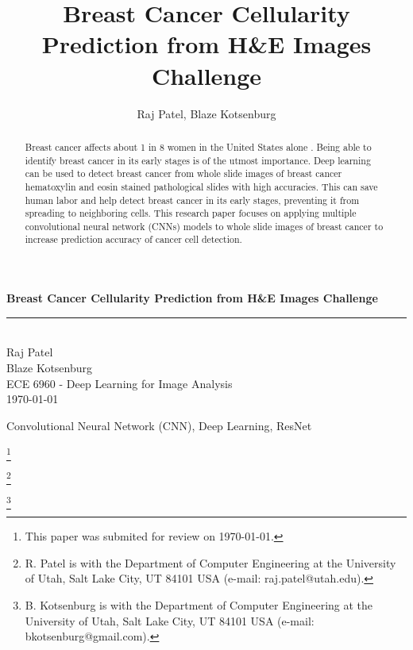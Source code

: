 \documentclass[12pt]{ieeeconf}
\title{Breast Cancer Cellularity Prediction from H\&E Images Challenge}
\author{Raj Patel, Blaze Kotsenburg}
\newcommand\blfootnote[1]{%
  \begingroup
  \renewcommand\thefootnote{}\footnote{#1}%
  \addtocounter{footnote}{-1}%
  \endgroup
}
\begin{document}
\begin{titlepage}
  \newcommand{\HRule}{\rule{\linewidth}{0.5mm}} %
  
  \vspace*{\fill}
  \center %
  
  { \huge \bfseries Breast Cancer Cellularity Prediction from H\&E Images Challenge}\\
  \HRule \\[1cm]

  \large Raj Patel\\
  \large Blaze Kotsenburg\\[1.5cm]

  \normalsize ECE 6960 - Deep Learning for Image Analysis\\
  \normalsize \today\\[4cm]
  
  \vspace*{\fill}
\end{titlepage}

\maketitle
\begin{abstract}
Breast cancer affects about 1 in 8 women in the United States alone \cite{web1}. Being able to identify breast cancer in its early stages is of the utmost importance. Deep learning can be used to detect breast cancer from whole slide images of breast cancer hematoxylin and eosin stained pathological slides with high accuracies. This can save human labor and help detect breast cancer in its early stages, preventing it from spreading to neighboring cells. This research paper focuses on applying multiple convolutional neural network (CNNs) models to whole slide images of breast cancer to increase prediction accuracy of cancer cell detection.
\end{abstract}

\begin{keywords}
  Convolutional Neural Network (CNN), Deep Learning, ResNet
\end{keywords}

\blfootnote{This paper was submited for review on \today.}
\blfootnote{R. Patel is with the Department of Computer Engineering at the University of Utah, Salt Lake City, UT 84101 USA (e-mail: raj.patel@utah.edu).}
\blfootnote{B. Kotsenburg is with the Department of Computer Engineering at the University of Utah, Salt Lake City, UT 84101 USA (e-mail: bkotsenburg@gmail.com).}
\end{document}
